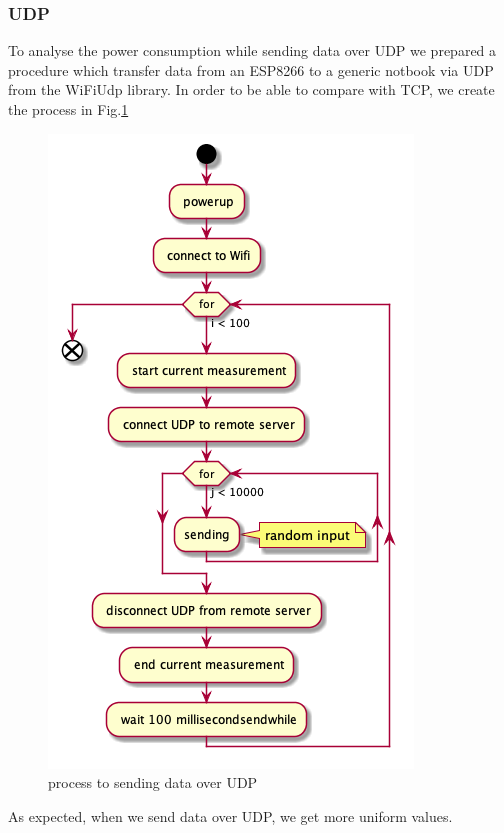 \subsubsection{UDP}
To analyse the power consumption while sending data over UDP we prepared a procedure which
transfer data from an ESP8266 to a generic notbook  via UDP from the WiFiUdp library.
In order to be able to compare with TCP, we create the process in Fig.\ref{fig:udp_uml}
\begin{figure}[h]
\centering
\includegraphics[width = 0.7 \linewidth]{fig/udp_tcp/udp_uml.png}
\caption{process to sending data over UDP}
\label{fig:udp_uml}
\end{figure}
\newline\newline
As expected, when we send data over UDP, we get more uniform values.
\linebreak\linebreak

